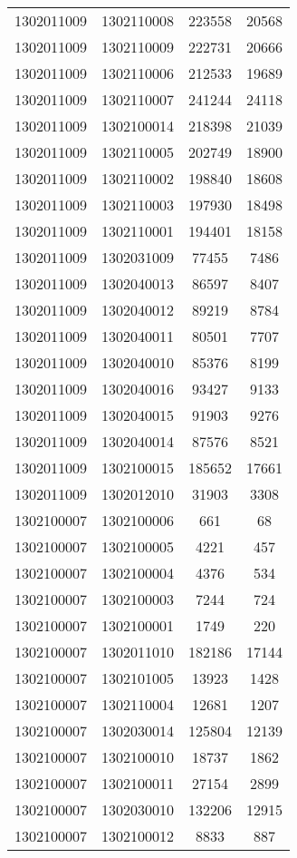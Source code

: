 \begin{longtable}[h]{llcc}
		1302011009 & 1302110008 & 223558 & 20568\\
		1302011009 & 1302110009 & 222731 & 20666\\
		1302011009 & 1302110006 & 212533 & 19689\\
		1302011009 & 1302110007 & 241244 & 24118\\
		1302011009 & 1302100014 & 218398 & 21039\\
		1302011009 & 1302110005 & 202749 & 18900\\
		1302011009 & 1302110002 & 198840 & 18608\\
		1302011009 & 1302110003 & 197930 & 18498\\
		1302011009 & 1302110001 & 194401 & 18158\\
		1302011009 & 1302031009 & 77455 & 7486\\
		1302011009 & 1302040013 & 86597 & 8407\\
		1302011009 & 1302040012 & 89219 & 8784\\
		1302011009 & 1302040011 & 80501 & 7707\\
		1302011009 & 1302040010 & 85376 & 8199\\
		1302011009 & 1302040016 & 93427 & 9133\\
		1302011009 & 1302040015 & 91903 & 9276\\
		1302011009 & 1302040014 & 87576 & 8521\\
		1302011009 & 1302100015 & 185652 & 17661\\
		1302011009 & 1302012010 & 31903 & 3308\\
		1302100007 & 1302100006 & 661 & 68\\
		1302100007 & 1302100005 & 4221 & 457\\
		1302100007 & 1302100004 & 4376 & 534\\
		1302100007 & 1302100003 & 7244 & 724\\
		1302100007 & 1302100001 & 1749 & 220\\
		1302100007 & 1302011010 & 182186 & 17144\\
		1302100007 & 1302101005 & 13923 & 1428\\
		1302100007 & 1302110004 & 12681 & 1207\\
		1302100007 & 1302030014 & 125804 & 12139\\
		1302100007 & 1302100010 & 18737 & 1862\\
		1302100007 & 1302100011 & 27154 & 2899\\
		1302100007 & 1302030010 & 132206 & 12915\\
		1302100007 & 1302100012 & 8833 & 887\\

\end{longtable}
